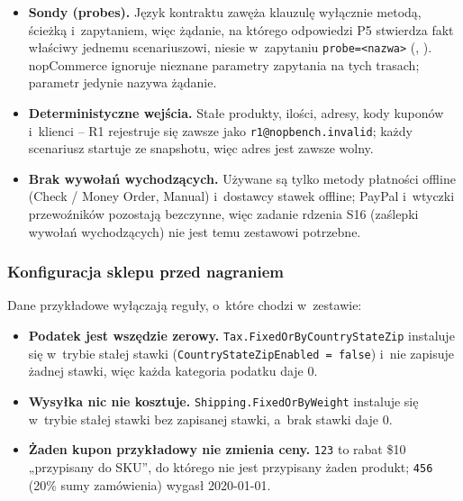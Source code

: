 \begin{itemize}
    (adresy skryptów checkoutu jednostronicowego), wskazują \texttt{:8080}. Przeglądarka,
    która by za nimi poszła, opuściłaby proxy; sesje ze skryptu żądają wyłącznie ścieżek
    względnych, a~przekierowania sprowadzają do ścieżki i~zapytania
    (\texttt{Get-BenchLocationPath}), więc nic nie omija nagrania.
  \item \textbf{Sondy (probes).} Język kontraktu zawęża klauzulę wyłącznie metodą,
    ścieżką i~zapytaniem, więc żądanie, na którego odpowiedzi P5 stwierdza fakt właściwy
    jednemu scenariuszowi, niesie w~zapytaniu \texttt{probe=<nazwa>}
    (, ). nopCommerce
    ignoruje nieznane parametry zapytania na tych trasach; parametr jedynie nazywa żądanie.
  \item \textbf{Deterministyczne wejścia.} Stałe produkty, ilości, adresy, kody kuponów
    i~klienci -- R1 rejestruje się zawsze jako \texttt{r1@nopbench.invalid}; każdy
    scenariusz startuje ze snapshotu, więc adres jest zawsze wolny.
  \item \textbf{Brak wywołań wychodzących.} Używane są tylko metody płatności offline
    (Check / Money Order, Manual) i~dostawcy stawek offline; PayPal i~wtyczki
    przewoźników pozostają bezczynne, więc zadanie rdzenia S16 (zaślepki wywołań
    wychodzących) nie jest temu zestawowi potrzebne.
\end{itemize}


\subsubsection{Konfiguracja sklepu przed nagraniem}\label{sec:bench-ruch-konfiguracja}

Dane przykładowe wyłączają reguły, o~które chodzi w~zestawie:
\begin{itemize}
  \item \textbf{Podatek jest wszędzie zerowy.} \texttt{Tax.FixedOrByCountryStateZip}
    instaluje się w~trybie stałej stawki (\texttt{CountryStateZipEnabled = false}) i~nie
    zapisuje żadnej stawki, więc każda kategoria podatku daje 0.
  \item \textbf{Wysyłka nic nie kosztuje.} \texttt{Shipping.FixedOrByWeight} instaluje się
    w~trybie stałej stawki bez zapisanej stawki, a~brak stawki daje 0.
  \item \textbf{Żaden kupon przykładowy nie zmienia ceny.} \texttt{123} to rabat \$10
    „przypisany do SKU”, do którego nie jest przypisany żaden produkt; \texttt{456} (20\%
    sumy zamówienia) wygasł 2020-01-01.
\end{itemize}

